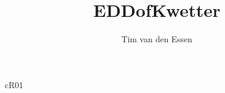 \documentclass[a4paper,english]{tvde/tvde}
\title{EDD\titlepagebreak{}of\titlepagebreak{}Kwetter} %
\subtitle{} %
\author{Tim van den Essen}
\begin{document}
\maketitle{}

\begin{tedocumenthistoryS}
\end{tedocumenthistoryS}

\begin{tedistributionlist}{c}{R01}
\end{tedistributionlist}

\tedocumentStar{} %


\tetableofcontents{}
\telistoffigures{}
\telistoftables{}
\telistoflistings{}



\end{document}
